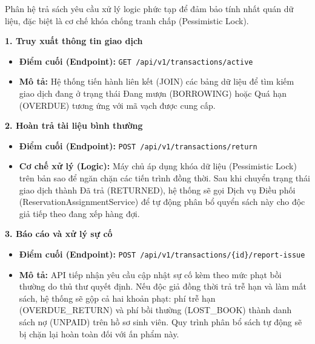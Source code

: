 Phân hệ trả sách yêu cầu xử lý logic phức tạp để đảm bảo tính nhất quán dữ liệu, đặc biệt là cơ chế khóa chống tranh chấp (Pessimistic Lock).

\noindent\textbf{1. Truy xuất thông tin giao dịch}
\begin{itemize}
    \item \textbf{Điểm cuối (Endpoint):} \texttt{GET /api/v1/transactions/active} 
    \item \textbf{Mô tả:} Hệ thống tiến hành liên kết (JOIN) các bảng dữ liệu để tìm kiếm giao dịch đang ở trạng thái Đang mượn (BORROWING) hoặc Quá hạn (OVERDUE) tương ứng với mã vạch được cung cấp.
\end{itemize}

\noindent\textbf{2. Hoàn trả tài liệu bình thường}
\begin{itemize}
    \item \textbf{Điểm cuối (Endpoint):} \texttt{POST /api/v1/transactions/return} 
    \item \textbf{Cơ chế xử lý (Logic):} Máy chủ áp dụng khóa dữ liệu (Pessimistic Lock) trên bản sao để ngăn chặn các tiến trình đồng thời. Sau khi chuyển trạng thái giao dịch thành Đã trả (RETURNED), hệ thống sẽ gọi Dịch vụ Điều phối (ReservationAssignmentService) để tự động phân bổ quyển sách này cho độc giả tiếp theo đang xếp hàng đợi.
\end{itemize}

\noindent\textbf{3. Báo cáo và xử lý sự cố}
\begin{itemize}
    \item \textbf{Điểm cuối (Endpoint):} \texttt{POST /api/v1/transactions/\{id\}/report-issue}
    \item \textbf{Mô tả:} API tiếp nhận yêu cầu cập nhật sự cố kèm theo mức phạt bồi thường do thủ thư quyết định. Nếu độc giả đồng thời trả trễ hạn và làm mất sách, hệ thống sẽ gộp cả hai khoản phạt: phí trễ hạn (OVERDUE\_RETURN) và phí bồi thường (LOST\_BOOK) thành danh sách nợ (UNPAID) trên hồ sơ sinh viên. Quy trình phân bổ sách tự động sẽ bị chặn lại hoàn toàn đối với ấn phẩm này.
\end{itemize}

